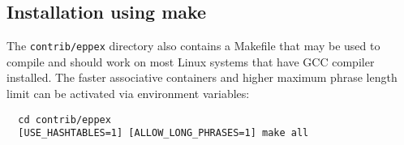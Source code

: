\subsection*{Installation using make}
The \texttt{contrib/eppex} directory also contains a Makefile that may be used to compile
\eppex{} and should work on most Linux systems that have GCC compiler installed.
The faster associative containers and higher maximum phrase length limit can be activated
via environment variables:
\begin{verbatim}
  cd contrib/eppex
  [USE_HASHTABLES=1] [ALLOW_LONG_PHRASES=1] make all
\end{verbatim}
